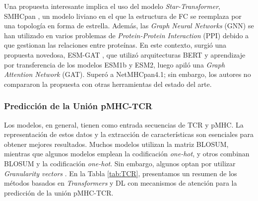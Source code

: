 Una propuesta interesante implica el uso del modelo \textit{Star-Transformer}, SMHCpan \citep{ye2023stmhcpan}, un modelo liviano en el que la estructura de FC se reemplaza por una topología en forma de estrella. Además, las \textit{Graph Neural Networks} (GNN) se han utilizado en varios problemas de \textit{Protein-Protein Interaction} (PPI) debido a que gestionan las relaciones entre proteínas. En este contexto, surgió una propuesta novedosa, ESM-GAT \citep{hashemi2023improved}, que utilizó arquitecturas BERT y aprendizaje por transferencia de los modelos ESM1b y ESM2, luego apiló una \textit{Graph Attention Network} (GAT). Superó a NetMHCpan4.1; sin embargo, los autores no compararon la propuesta con otras herramientas del estado del arte.

\subsubsection{Predicción de la Unión pMHC-TCR}


Los modelos, en general, tienen como entrada secuencias de TCR y pMHC. La representación de estos datos y la extracción de características son esenciales para obtener mejores resultados. Muchos modelos utilizan la matriz BLOSUM, mientras que algunos modelos emplean la codificación \textit{one-hot}, y otros combinan BLOSUM y la codificación \textit{one-hot}. Sin embargo, algunos optan por utilizar \textit{Granularity vectors} \citep{xu2022attntap}. En la Tabla \ref{tab:TCR}, presentamos un resumen de los métodos basados en \textit{Transformers} y DL con mecanismos de atención para la predicción de la unión pMHC-TCR.

